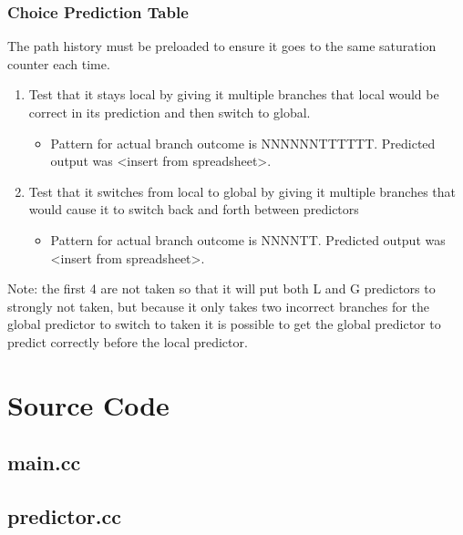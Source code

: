 \documentclass[]{report}   %
\begin{document}
\subsection{Choice Prediction Table}
The path history must be preloaded to ensure it goes to the same saturation counter each time.
\begin{enumerate}
  \item{Test that it stays local by giving it multiple branches that local would be correct in its prediction and then switch to global.}
    \begin{itemize}
      \item{Pattern for actual branch outcome is NNNNNNTTTTTT. Predicted output was <insert from spreadsheet>.}
    \end{itemize}
  \item{Test that it switches from local to global by giving it multiple branches that would cause it to switch back and forth between predictors}
    \begin{itemize}
      \item{Pattern for actual branch outcome is NNNNTT. Predicted output was <insert from spreadsheet>.}
    \end{itemize}
\end{enumerate}

Note: the first 4 are not taken so that it will put both L and G predictors to strongly not taken, but because it only takes two incorrect branches for the global predictor to switch to taken it is possible to get the global predictor to predict correctly before the local predictor.


\chapter{Source Code}
\section{main.cc}

\pagebreak

\section{predictor.cc}

\pagebreak



\end{document}
